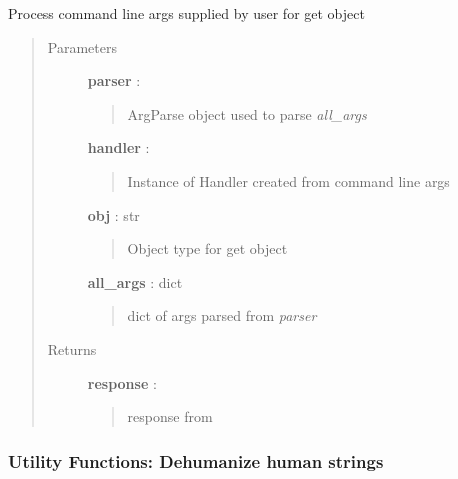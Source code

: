 \documentclass[letterpaper,10pt,english]{sphinxmanual}
\begin{document}
\begin{fulllineitems}
\label{pytan.utils:pytan.utils.process_get_object_args}
Process command line args supplied by user for get object
\begin{quote}\begin{description}
\item[{Parameters}] \leavevmode
\textbf{parser} : 
\begin{quote}

ArgParse object used to parse \emph{all\_args}
\end{quote}

\textbf{handler} : {\hyperref[pytan.handler:pytan.handler.Handler]{}}
\begin{quote}

Instance of Handler created from command line args
\end{quote}

\textbf{obj} : str
\begin{quote}

Object type for get object
\end{quote}

\textbf{all\_args} : dict
\begin{quote}

dict of args parsed from \emph{parser}
\end{quote}

\item[{Returns}] \leavevmode
\textbf{response} : {\hyperref[taniumpy.object_types:taniumpy.object_types.base.BaseType]{}}
\begin{quote}

response from {\hyperref[pytan.handler:pytan.handler.Handler.get]{}}
\end{quote}

\end{description}\end{quote}

\end{fulllineitems}



\subsubsection{Utility Functions: Dehumanize human strings}
\label{pytan.utils:utility-functions-dehumanize-human-strings}
\end{document}
